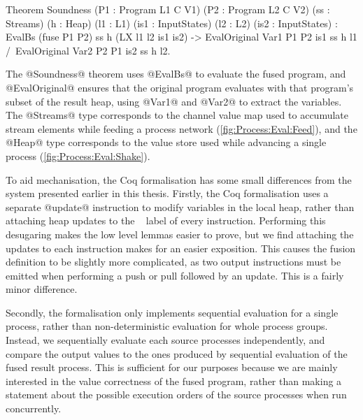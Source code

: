 
\begin{coq}
Theorem Soundness (P1 : Program L1 C V1) (P2  : Program L2 C V2)
                  (ss : Streams)         (h   : Heap)
                  (l1 : L1)              (is1 : InputStates)
                  (l2 : L2)              (is2 : InputStates)
  :  EvalBs (fuse P1 P2) ss h (LX l1 l2 is1 is2)
  -> EvalOriginal Var1 P1 P2 is1 ss h l1
  /\ EvalOriginal Var2 P2 P1 is2 ss h l2.
\end{coq}

The @Soundness@ theorem uses @EvalBs@ to evaluate the fused program, and @EvalOriginal@ ensures that the original program evaluates with that program's subset of the result heap, using @Var1@ and @Var2@ to extract the variables.
The @Streams@ type corresponds to the channel value map used to accumulate stream elements while feeding a process network (\autoref{fig:Process:Eval:Feed}), and the @Heap@ type corresponds to the value store used while advancing a single process (\autoref{fig:Process:Eval:Shake}).


To aid mechanisation, the Coq formalisation has some small differences from the system presented earlier in this thesis.
Firstly, the Coq formalisation uses a separate @update@ instruction to modify variables in the local heap, rather than attaching heap updates to the \Next~ label of every instruction.
Performing this desugaring makes the low level lemmas easier to prove, but we find attaching the updates to each instruction makes for an easier exposition.
This causes the fusion definition to be slightly more complicated, as two output instructions must be emitted when performing a push or pull followed by an update.
This is a fairly minor difference.

Secondly, the formalisation only implements sequential evaluation for a single process, rather than non-deterministic evaluation for whole process groups.
Instead, we sequentially evaluate each source processes independently, and compare the output values to the ones produced by sequential evaluation of the fused result process.
This is sufficient for our purposes because we are mainly interested in the value correctness of the fused program, rather than making a statement about the possible execution orders of the source processes when run concurrently.

